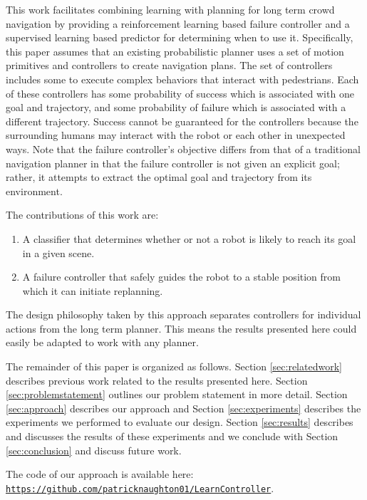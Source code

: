 \documentclass[letterpaper, 10 pt, conference]{ieeeconf}  %
\begin{document}
	This work facilitates combining learning with planning for long term crowd navigation by providing a reinforcement learning based failure controller and a supervised learning based predictor for determining when to use it. Specifically, this paper assumes that an existing probabilistic planner uses a set of motion primitives and controllers to create navigation plans. The set of controllers includes some to execute complex behaviors that interact with pedestrians. Each of these controllers has some probability of success which is associated with one goal and trajectory, and some probability of failure which is associated with a different trajectory. Success cannot be guaranteed for the controllers because the surrounding humans may interact with the robot or each other in unexpected ways. Note that the failure controller's objective differs from that of a traditional navigation planner in that the failure controller is not given an explicit goal; rather, it attempts to extract the optimal goal and trajectory from its environment.

	The contributions of this work are:
	\begin{enumerate}
		\item A classifier that determines whether or not a robot is likely to reach its goal in a given scene.
		\item A failure controller that safely guides the robot to a stable position from which it can initiate replanning.
	\end{enumerate}
	The design philosophy taken by this approach separates controllers for individual actions from the long term planner. This means the results presented here could easily be adapted to work with any planner.
	
	The remainder of this paper is organized as follows. Section \ref{sec:relatedwork} describes previous work related to the results presented here. Section \ref{sec:problemstatement} outlines our problem statement in more detail. Section \ref{sec:approach} describes our approach and Section \ref{sec:experiments} describes the experiments we performed to evaluate our design. Section \ref{sec:results} describes and discusses the results of these experiments and we conclude with Section \ref{sec:conclusion} and discuss future work.
	
	The code of our approach is available here: \texttt{\url{https://github.com/patricknaughton01/LearnController}}.
	
\end{document}
